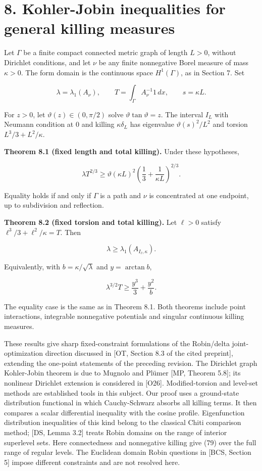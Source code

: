 \documentclass[11pt]{article}
\begin{document}
\section{8. Kohler-Jobin inequalities for general killing
measures}\label{kohler-jobin-inequalities-for-general-killing-measures}

Let \(\Gamma\) be a finite compact connected metric graph of length
\(L>0\), without Dirichlet conditions, and let \(\nu\) be any finite
nonnegative Borel measure of mass \(\kappa>0\). The form domain is the
continuous space \(H^1(\Gamma)\), as in Section 7. Set

\[
\lambda=\lambda_1(A_\nu),\qquad
T=\int_\Gamma A_\nu^{-1}1\,dx,\qquad s=\kappa L.
\tag{69}
\]

For \(z>0\), let \(\vartheta(z)\in(0,\pi/2)\) solve
\(\vartheta\tan\vartheta=z\). The interval \(I_L\) with Neumann
condition at \(0\) and killing \(\kappa\delta_L\) has eigenvalue
\(\vartheta(s)^2/L^2\) and torsion \(L^3/3+L^2/\kappa\).

\textbf{Theorem 8.1 (fixed length and total killing).} Under these
hypotheses,

\[
\lambda T^{2/3}\ge
\vartheta(\kappa L)^2
\left(\frac13+\frac1{\kappa L}\right)^{2/3}.
\tag{70}
\]

Equality holds if and only if \(\Gamma\) is a path and \(\nu\) is
concentrated at one endpoint, up to subdivision and reflection.

\textbf{Theorem 8.2 (fixed torsion and total killing).} Let \(\ell>0\)
satisfy \(\ell^3/3+\ell^2/\kappa=T\). Then

\[
\lambda\ge\lambda_1(A_{I_\ell,\kappa}).
\tag{71}
\]

Equivalently, with \(b=\kappa/\sqrt\lambda\) and \(y=\arctan b\),

\[
\lambda^{3/2}T\ge \frac{y^3}{3}+\frac{y^2}{b}.
\tag{72}
\]

The equality case is the same as in Theorem 8.1. Both theorems include
point interactions, integrable nonnegative potentials and singular
continuous killing measures.

These results give sharp fixed-constraint formulations of the
Robin/delta joint-optimization direction discussed in {[}OT, Section 8.3
of the cited preprint{]}, extending the one-point statements of the
preceding revision. The Dirichlet graph Kohler-Jobin theorem is due to
Mugnolo and Plümer {[}MP, Theorem 5.8{]}; its nonlinear Dirichlet
extension is considered in {[}O26{]}. Modified-torsion and level-set
methods are established tools in this subject. Our proof uses a
ground-state distribution functional in which Cauchy-Schwarz absorbs all
killing terms. It then compares a scalar differential inequality with
the cosine profile. Eigenfunction distribution inequalities of this kind
belong to the classical Chiti comparison method; {[}DS, Lemma 3.2{]}
treats Robin domains on the range of interior superlevel sets. Here
connectedness and nonnegative killing give (79) over the full range of
regular levels. The Euclidean domain Robin questions in {[}BCS, Section
5{]} impose different constraints and are not resolved here.
\end{document}
